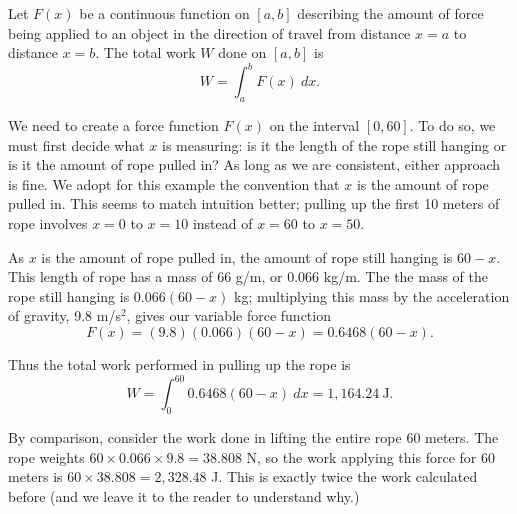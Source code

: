 {Let $F(x)$ be a continuous function on $[a,b]$ describing the amount of force being applied to an object in the direction of travel from distance $x=a$ to distance $x=b$. The total work $W$ done on $[a,b]$ is
\[W = \int_a^b F(x)\ dx.\]}


{We need to create a force function $F(x)$ on the interval $[0,60]$. To do so, we must first decide what $x$ is measuring: is it the length of the rope still hanging or is it the amount of rope pulled in? As long as we are consistent, either approach is fine. We adopt for this example the convention that $x$ is the amount of rope pulled in. This seems to match intuition better; pulling up the first 10 meters of rope involves $x=0$ to $x=10$ instead of $x=60$ to $x=50$. 

As $x$ is the amount of rope pulled in, the amount of rope still hanging is $60-x$. This length of rope has a mass of 66 g/m, or $0.066$ kg/m. The the mass of the rope still hanging is $0.066(60-x)$ kg; multiplying this mass by the acceleration of gravity, 9.8 m/s$^2$, gives our variable force function
\[F(x) = (9.8)(0.066)(60-x) = 0.6468(60-x).\]

Thus the total work performed in pulling up the rope is 
\[W = \int_0^{60} 0.6468(60-x)\ dx = 1,164.24\ \text{J}.\]

By comparison, consider the work done in lifting the entire rope 60 meters. The rope weights $60\times 0.066 \times 9.8 = 38.808$ N, so the work applying this force for 60 meters is $60\times 38.808 = 2,328.48$ J. This is exactly twice the work calculated before (and we leave it to the reader to understand why.)}

